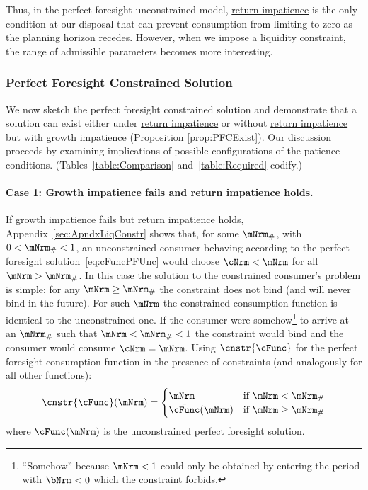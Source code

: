 \documentclass[BufferStockTheory]{subfiles}
\begin{document}
Thus, in the perfect foresight unconstrained model, \hyperlink{RIC}{return impatience} is the only condition at our disposal that can prevent consumption from limiting to zero as the planning horizon recedes. However, when we impose a liquidity constraint, the range of admissible parameters becomes more interesting.

\hypertarget{PF-Constrained-Solution}{}
\hypertarget{Constrained-Solution}{}
\subsubsection{Perfect Foresight Constrained Solution}\label{subsec:PFCon}

We now sketch the perfect foresight constrained solution and demonstrate that a solution can exist either under \hyperlink{RIC}{return impatience} or without \hyperlink{RIC}{return impatience} but with \hyperlink{GICRaw}{growth impatience} (Proposition \ref{prop:PFCExist}). Our discussion proceeds by examining implications of possible configurations of the patience conditions.  (Tables~\ref{table:Comparison} and~\ref{table:Required} codify.)


\paragraph{Case 1: Growth impatience fails and return impatience holds.} If \hyperlink{GICRaw}{growth impatience} fails but \hyperlink{RIC}{return impatience} holds, Appendix~\ref{sec:ApndxLiqConstr} shows that, for some $\mNrm_{\#}$, with $0 < \mNrm_{\#} < 1$, an unconstrained consumer behaving according to the perfect foresight solution~\eqref{eq:cFuncPFUnc} would choose $\cNrm < \mNrm$ for all $\mNrm > \mNrm_{\#}$.  In this case the solution to the constrained consumer's problem is simple; for any $\mNrm \geq \mNrm_{\#}$ the constraint does not bind (and will never bind in the future).  For such $\mNrm$ the constrained consumption function is identical to the unconstrained one.  If the consumer were somehow\footnote{``Somehow'' because $\mNrm<1$ could only be obtained by entering the period with $\bNrm < 0$ which the constraint forbids.} to arrive at an $\mNrm_{\#}$ such that $\mNrm < \mNrm_{\#} < 1$ the constraint would bind and the consumer would consume $\cNrm=\mNrm$.  Using $\cnstr{\cFunc}$ for the perfect foresight consumption function in the presence of constraints  (and analogously for all other functions):
\begin{equation*}
  \cnstr{\cFunc}(\mNrm)=
  \begin{cases}
    \mNrm & \text{if $\mNrm < \mNrm_{\#}$} \\
    \bar{\cFunc}(\mNrm)  & \text{if $\mNrm \geq \mNrm_{\#}$}
  \end{cases}
\end{equation*}
where $\bar{\cFunc}(\mNrm)$ is the unconstrained perfect foresight solution. 
\end{document}
